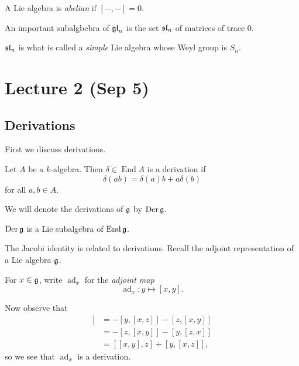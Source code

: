 \documentclass[twoside, 10pt]{article}
\begin{document}
    \begin{defn} A Lie algebra is \textit{abelian} if $[-,-] = 0$.  \end{defn}

    \begin{exm} An important subalgbebra of $\mathfrak{gl}_n$ is the set $\mathfrak{sl}_n$
    of matrices of trace $0$.  \end{exm}

    \begin{rmk} $\mathfrak{sl}_n$ is what is called a \textit{simple} Lie algebra
    whose Weyl group is $S_n$.  \end{rmk}

    \section{Lecture 2 (Sep 5)}%
    
    \subsection{Derivations}%
    
    
    First we discuss derivations.

    \begin{defn} Let $A$ be a $k$-algebra. Then $\delta \in \operatorname{End}
        A$ is a derivation if \[\delta(ab) = \delta(a)b+a\delta(b)\] for all
    $a,b \in A$.  \end{defn}

    We will denote the derivations of $\mathfrak{g}$ by $\operatorname{Der} \mathfrak{g}$.

    \begin{rmk} $\operatorname{Der} \mathfrak{g}$ is a Lie subalgebra of $\operatorname{End}{\mathfrak{g}}$.  \end{rmk}

    The Jacobi identity is related to derivations. Recall the adjoint
    representation of a Lie algebra $\mathfrak{g}$.

    \begin{defn} For $x \in \mathfrak{g}$, write $\operatorname{ad}_x$ for the
        \textit{adjoint map} \[\operatorname{ad}_x: y \mapsto [x,y].\]
    \end{defn}

    Now observe that \begin{align*} [x,[y,z]] &= -[y,[x,z]] - [z,[x,y]] \\ &=
    -[z,[x,y]] - [y,[z,x]] \\ &= [[x,y],z] + [y, [x,z]], \end{align*} so we see
    that $\operatorname{ad}_x$ is a derivation.
\end{document}
